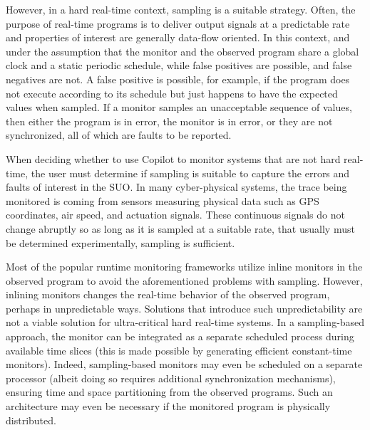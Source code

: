 However, in a hard real-time context, sampling is a suitable strategy.
%
 Often, the purpose of real-time programs is to deliver output signals at a
predictable rate and properties of interest are generally data-flow oriented.
%
 In this context, and under the assumption that the monitor and the observed
program share a global clock and a static periodic schedule, while false
positives are possible, and false negatives are not.
%
 A false positive is possible, for example, if the program does not execute
according to its schedule but just happens to have the expected values when
sampled. 
%
 If a monitor samples an unacceptable sequence of values, then either the
program is in error, the monitor is in error, or they are not synchronized, all
of which are faults to be reported.
%

When deciding whether to use Copilot to monitor systems that are not hard
real-time, the user must determine if sampling is suitable to capture the
errors and faults of interest in the  SUO. In many cyber-physical systems, the
trace being monitored is coming from sensors measuring physical data such as
GPS coordinates, air speed, and actuation signals.
%
 These continuous signals do not change abruptly so as long as it is sampled at
a suitable rate, that usually must be determined experimentally, sampling is
sufficient.
%

Most of the popular runtime monitoring frameworks utilize inline monitors in the
observed program to avoid the aforementioned problems with sampling.
%
 However, inlining monitors changes the real-time behavior of the observed
program, perhaps in unpredictable  ways.
%
Solutions that introduce such unpredictability are not a viable solution for
ultra-critical hard real-time systems.
%
 In a sampling-based approach, the monitor can be integrated as a separate
scheduled process during available time slices (this is made possible by
generating efficient constant-time monitors).
%
 Indeed, sampling-based monitors may even be scheduled on a separate processor
(albeit doing so requires additional synchronization mechanisms), ensuring time
and space partitioning from the observed programs.
%
 Such an architecture may even be necessary if the monitored program is
physically distributed.




